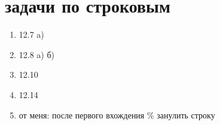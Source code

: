 \documentclass[a4paper,10pt]{article}
\begin{document}
\section*{задачи по строковым}
\begin{enumerate}
    \item 12.7 a)
    \item 12.8 a) б)
    \item 12.10
    \item 12.14
    \item от меня: после первого вхождения \% занулить строку
\end{enumerate}
\end{document}

